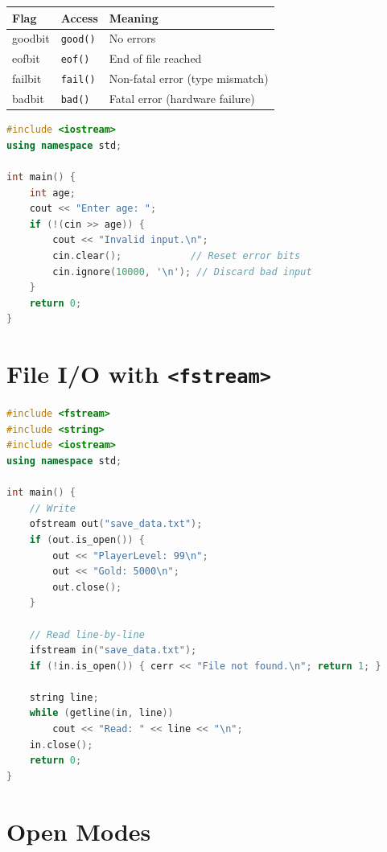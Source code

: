 \begin{center}
\begin{tabular}{|l|l|l|}
\hline
\textbf{Flag} & \textbf{Access} & \textbf{Meaning} \\
\hline
goodbit & \texttt{good()} & No errors \\
eofbit  & \texttt{eof()}  & End of file reached \\
failbit & \texttt{fail()} & Non-fatal error (type mismatch) \\
badbit  & \texttt{bad()}  & Fatal error (hardware failure) \\
\hline
\end{tabular}
\end{center}

\begin{lstlisting}[language=C++, caption={Recovering from stream error state}]
#include <iostream>
using namespace std;

int main() {
    int age;
    cout << "Enter age: ";
    if (!(cin >> age)) {
        cout << "Invalid input.\n";
        cin.clear();            // Reset error bits
        cin.ignore(10000, '\n'); // Discard bad input
    }
    return 0;
}
\end{lstlisting}

\section{File I/O with \texttt{<fstream>}}
\label{sec:fstream}

\begin{lstlisting}[language=C++, caption={Writing and reading text files}]
#include <fstream>
#include <string>
#include <iostream>
using namespace std;

int main() {
    // Write
    ofstream out("save_data.txt");
    if (out.is_open()) {
        out << "PlayerLevel: 99\n";
        out << "Gold: 5000\n";
        out.close();
    }

    // Read line-by-line
    ifstream in("save_data.txt");
    if (!in.is_open()) { cerr << "File not found.\n"; return 1; }

    string line;
    while (getline(in, line))
        cout << "Read: " << line << "\n";
    in.close();
    return 0;
}
\end{lstlisting}

\section{Open Modes}
\label{sec:open-modes}

